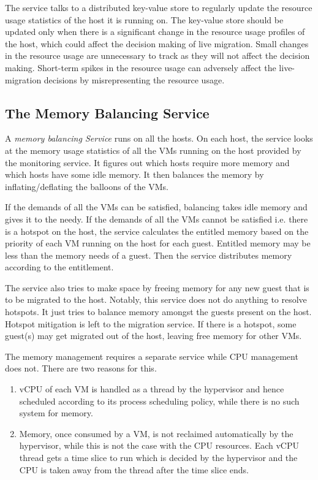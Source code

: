 The service talks to a distributed key-value store to regularly update the resource usage statistics of the host it is running on. The key-value store should be updated only when there is a significant change in the resource usage profiles of the host, which could affect the decision making of live migration. Small changes in the resource usage are unnecessary to track as they will not affect the decision making. Short-term spikes in the resource usage can adversely affect the live-migration decisions by misrepresenting the resource usage.

\subsection{The Memory Balancing Service}
A \textit{memory balancing Service} runs on all the hosts. On each host, the service looks at the memory usage statistics of all the VMs running on the host provided by the monitoring service. It figures out which hosts require more memory and which hosts have some idle memory. It then balances the memory by inflating/deflating the balloons of the VMs.

If the demands of all the VMs can be satisfied, balancing takes idle memory and gives it to the needy. If the demands of all the VMs cannot be satisfied i.e. there is a hotspot on the host, the service calculates the entitled memory based on the priority of each VM running on the host for each guest. Entitled memory may be less than the memory needs of a guest. Then the service distributes memory according to the entitlement. 

The service also tries to make space by freeing memory for any new guest that is to be migrated to the host. Notably, this service does not do anything to resolve hotspots. It just tries to balance memory amongst the guests present on the host. Hotspot mitigation is left to the migration service. If there is a hotspot, some guest(s) may get migrated out of the host, leaving free memory for other VMs.

The memory management requires a separate service while CPU management does not. There are two reasons for this.
\begin{enumerate}
\item vCPU of each VM is handled as a thread by the hypervisor and hence scheduled according to its process scheduling policy, while there is no such system for memory.
\item Memory, once consumed by a VM, is not reclaimed automatically by the hypervisor, while this is not the case with the CPU resources. Each vCPU thread gets a time slice to run which is decided by the hypervisor and the CPU is taken away from the thread after the time slice ends.

\end{enumerate}

